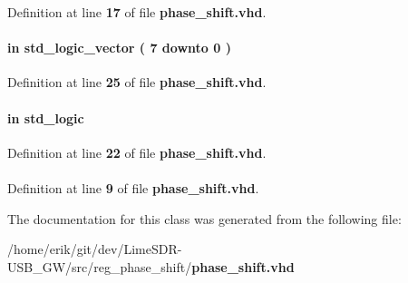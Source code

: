 Definition at line {\bf 17} of file {\bf phase\+\_\+shift.\+vhd}.

\paragraph[{reg\+\_\+sel}]{ {\bfseries \textcolor{keywordflow}{in}\textcolor{vhdlchar}{ }} {\bfseries \textcolor{comment}{std\+\_\+logic\+\_\+vector}\textcolor{vhdlchar}{ }\textcolor{vhdlchar}{(}\textcolor{vhdlchar}{ }\textcolor{vhdlchar}{ } \textcolor{vhdldigit}{7} \textcolor{vhdlchar}{ }\textcolor{keywordflow}{downto}\textcolor{vhdlchar}{ }\textcolor{vhdlchar}{ } \textcolor{vhdldigit}{0} \textcolor{vhdlchar}{ }\textcolor{vhdlchar}{)}\textcolor{vhdlchar}{ }} \hspace{0.3cm}{\ttfamily [Port]}}\label{classphase__shift_a7712e67eb4ec245f4c28ba9d64237bfa}


Definition at line {\bf 25} of file {\bf phase\+\_\+shift.\+vhd}.

\paragraph[{reset\+\_\+n}]{ {\bfseries \textcolor{keywordflow}{in}\textcolor{vhdlchar}{ }} {\bfseries \textcolor{comment}{std\+\_\+logic}\textcolor{vhdlchar}{ }} \hspace{0.3cm}{\ttfamily [Port]}}\label{classphase__shift_a446ea52ed8c4a84181a47d9165ce41a5}


Definition at line {\bf 22} of file {\bf phase\+\_\+shift.\+vhd}.

\paragraph[{std\+\_\+logic\+\_\+1164}]{\hspace{0.3cm}{\ttfamily [Package]}}\label{classphase__shift_acd03516902501cd1c7296a98e22c6fcb}


Definition at line {\bf 9} of file {\bf phase\+\_\+shift.\+vhd}.



The documentation for this class was generated from the following file\+:\begin{DoxyCompactItemize}
\item 
/home/erik/git/dev/\+Lime\+S\+D\+R-\/\+U\+S\+B\+\_\+\+G\+W/src/reg\+\_\+phase\+\_\+shift/{\bf phase\+\_\+shift.\+vhd}\end{DoxyCompactItemize}
